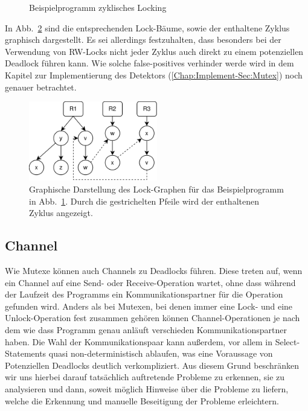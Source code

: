 \begin{figure}[h!]
  
  \caption{Beispielprogramm zyklisches Locking}
  \label{Chap:Analyze-Sec:Mutex-Fig:ZyclicTreeCode}
\end{figure}
In Abb.~\ref{Chap:Analyze-Sec:Mutex-Fig:ZyclicTreeImg} sind die entsprechenden
Lock-Bäume, sowie der enthaltene Zyklus graphisch dargestellt. Es sei allerdings 
festzuhalten, dass besonders bei der Verwendung von RW-Locks nicht jeder 
Zyklus auch direkt zu einem potenziellen Deadlock führen kann. Wie solche 
false-positives verhinder werde wird in dem Kapitel zur Implementierung
des Detektors (\ref{Chap:Implement-Sec:Mutex}) noch genauer betrachtet.
\begin{figure}[h!]
  \centering
  \includegraphics[width=0.5\textwidth]{img/tree_example.eps}
  \caption{Graphische Darstellung des Lock-Graphen für das Beispielprogramm in 
    Abb.~\ref{Chap:Analyze-Sec:Mutex-Fig:ZyclicTreeCode}. Durch die gestrichelten 
    Pfeile wird der enthaltenen Zyklus angezeigt.}
    \label{Chap:Analyze-Sec:Mutex-Fig:ZyclicTreeImg}
\end{figure}


\subsection{Channel}


Wie Mutexe können auch Channels zu Deadlocks führen. Diese treten auf,
wenn ein Channel auf eine Send- oder Receive-Operation wartet, ohne dass
während der Laufzeit des Programms ein Kommunikationspartner für die 
Operation gefunden wird. Anders als bei Mutexen, bei denen immer eine Lock-
und eine Unlock-Operation fest zusammen gehören können Channel-Operationen
je nach dem wie dass Programm genau anläuft verschieden Kommunikationspartner 
haben. Die Wahl der Kommunikationspaar kann außerdem, vor allem in Select-Statements
quasi non-deterministisch ablaufen, was eine Voraussage von Potenziellen 
Deadlocks deutlich verkompliziert. Aus diesem Grund beschränken wir uns 
hierbei darauf tatsächlich auftretende Probleme zu erkennen, sie zu analysieren 
und dann, soweit möglich Hinweise über die Probleme zu liefern, welche die 
Erkennung und manuelle Beseitigung der Probleme erleichtern.


